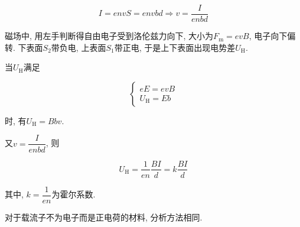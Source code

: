 \begin{equation}
	I = envS = envbd \Rightarrow v = \dfrac{I}{enbd} \label{C8-eq11}
\end{equation}

磁场中, 用左手判断得自由电子受到洛伦兹力向下, 大小为$F_{\textrm{m}} = evB$, 电子向下偏转. 下表面$S_2$带负电, 上表面$S_1$带正电, 于是上下表面出现电势差$U_{\textrm{H}}$.

当$U_{\textrm{H}}$满足

\begin{equation*}
	\begin{cases}
		eE = evB \\
		U_{\textrm{H}} = Eb
	\end{cases}
\end{equation*}

时, 有$U_{\textrm{H}} = Bbv$.

\vskip 0.3cm

又$v = \dfrac{I}{enbd}$, 则

\begin{equation}
	U_{\textrm{H}} = \dfrac{1}{en} \dfrac{BI}{d} = k\dfrac{BI}{d} \label{C8-eq12}
\end{equation}

其中, $k = \dfrac{1}{en}$为霍尔系数. 

\vskip 0.3cm

对于载流子不为电子而是正电荷的材料, 分析方法相同. 

